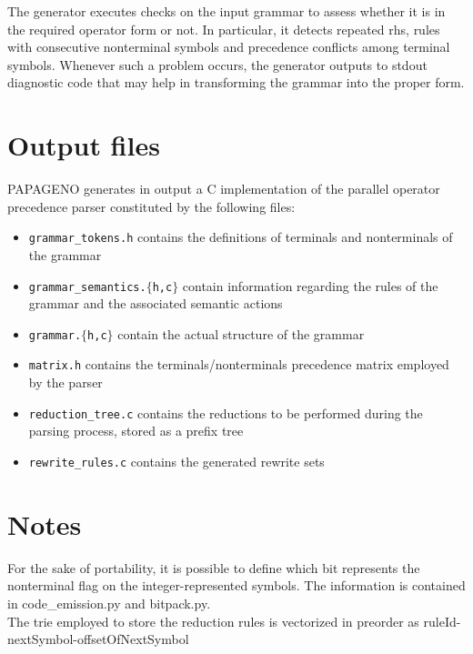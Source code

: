 \documentclass[a4paper,10pt]{article}
\begin{document}
The generator executes checks on the input grammar to assess whether it is in
the required operator form or not. In particular, it detects repeated rhs,
rules with consecutive nonterminal symbols and precedence conflicts among
terminal symbols. Whenever such a problem occurs, the generator outputs to
stdout diagnostic code that may help in transforming the grammar into the proper
form.

\section{Output files}

PAPAGENO generates in output a C implementation of the parallel operator precedence parser constituted by the following files:
\begin{itemize}
 \item \texttt{grammar\_tokens.h} contains the definitions of terminals and nonterminals of the grammar
 \item \texttt{grammar\_semantics.$\{$h,c$\}$} contain information regarding the rules of the grammar and the associated semantic actions
 \item \texttt{grammar.$\{$h,c$\}$} contain the actual structure of the grammar
 \item \texttt{matrix.h} contains the terminals/nonterminals precedence matrix employed by the parser
 \item \texttt{reduction\_tree.c} contains the reductions to be performed during the parsing process, stored as a prefix tree
 \item \texttt{rewrite\_rules.c} contains the generated rewrite sets
\end{itemize}

\section{Notes}
For the sake of portability, it is possible to define which bit represents the nonterminal flag on the integer-represented symbols.
The information is contained in code\_emission.py and bitpack.py.\\

The trie employed to store the reduction rules is vectorized in preorder as ruleId-nextSymbol-offsetOfNextSymbol
\end{document}
